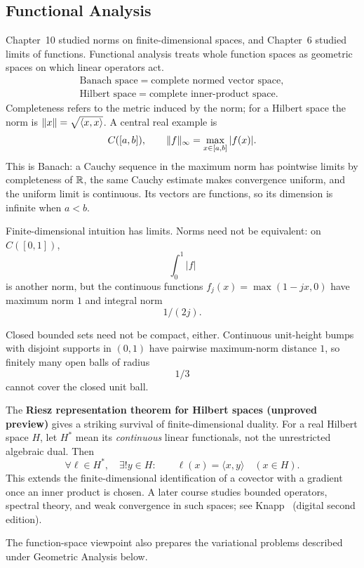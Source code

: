 \subsection*{Functional Analysis}

Chapter~10 studied norms on finite-dimensional spaces, and Chapter~6
studied limits of functions. Functional analysis treats whole function
spaces as geometric spaces on which linear operators act.
\[
\begin{gathered}
\boxed{\text{Banach space}=\text{complete normed vector space},}\\[4pt]
\boxed{\text{Hilbert space}=\text{complete inner-product space}.}
\end{gathered}
\]
Completeness refers to the metric induced by the norm; for a Hilbert space
the norm is $\lVert x\rVert=\sqrt{\langle x,x\rangle}$. A central real example is
\[
C([a,b]),\qquad \lVert f\rVert_\infty=\max_{x\in[a,b]}|f(x)|.
\]
This is Banach: a Cauchy sequence in the maximum norm has pointwise limits
by completeness of $\mathbb{R}$, the same Cauchy estimate makes convergence uniform,
and the uniform limit is continuous. Its vectors are functions, so its
dimension is infinite when $a<b$.

Finite-dimensional intuition has limits. Norms need not be equivalent:
on $C([0,1])$,
\[
\int_0^1|f|
\]
 is another norm, but the continuous functions
$f_j(x)=\max(1-jx,0)$ have maximum norm $1$ and integral norm
\[
1/(2j).
\]

Closed bounded sets need not be compact, either. Continuous unit-height
bumps with disjoint supports in $(0,1)$ have pairwise maximum-norm distance
$1$, so finitely many open balls of radius
\[
1/3
\]
 cannot cover the closed unit ball.

The \textbf{Riesz representation theorem for Hilbert spaces (unproved
preview)} gives a striking survival of finite-dimensional duality.
For a real Hilbert space $H$, let $H^*$ mean its \emph{continuous} linear
functionals, not the unrestricted algebraic dual. Then
\[
\forall\ell\in H^*,\quad\exists!y\in H:\qquad
\boxed{\ell(x)=\langle x,y\rangle\quad(x\in H).}
\]
This extends the finite-dimensional identification of a covector with a
gradient once an inner product is chosen. A later course studies bounded
operators, spectral theory, and weak convergence in such spaces; see
Knapp~\cite[Theorem~12.5]{knapp-basic-real} (digital second edition).

The function-space viewpoint also prepares the variational problems described
under Geometric Analysis below.

